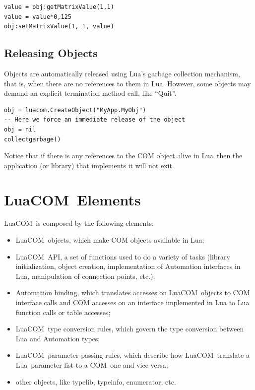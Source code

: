 \documentclass[11pt,a4paper,english]{report}
\newcommand{\techname}[1]{\mbox{#1}}
\newcommand{\lua}{\techname{Lua}}
\newcommand{\com}{\techname{COM}}
\newcommand{\luacom}{\techname{LuaCOM}}
\begin{document}
\begin{verbatim}
value = obj:getMatrixValue(1,1)
value = value*0,125
obj:setMatrixValue(1, 1, value)
\end{verbatim}



\section{Releasing Objects}
Objects are automatically released using Lua's garbage collection
mechanism, that is, when there are no references to them in
Lua. However, some objects may demand an explicit termination method
call, like ``Quit''.

\begin{verbatim}
obj = luacom.CreateObject("MyApp.MyObj")
-- Here we force an immediate release of the object
obj = nil
collectgarbage()
\end{verbatim}

Notice that if there is any references to the COM object alive in
\lua\, then the application (or library) that implements it will not
exit.



\chapter{\luacom\ Elements}

  \luacom\ is composed by the following elements:

  \begin{itemize}

    \item \luacom\ objects, which make COM objects available in Lua;

    \item \luacom\ API, a set of functions used to do a variety of
    tasks (library initialization, object creation, implementation of
    Automation interfaces in Lua, manipulation of connection points,
    etc.);

    \item Automation binding, which translates accesses on \luacom\
    objects to COM interface calls and COM accesses on an interface
    implemented in Lua to Lua function calls or table accesses;

    \item \luacom\ type conversion rules, which govern the type conversion
    between Lua and Automation types;

    \item \luacom\ parameter passing rules, which describe how \luacom\
    translate a \lua\ parameter list to a \com\ one and vice versa;

    \item other objects, like typelib, typeinfo, enumerator, etc.

  \end{itemize}
\end{document}
